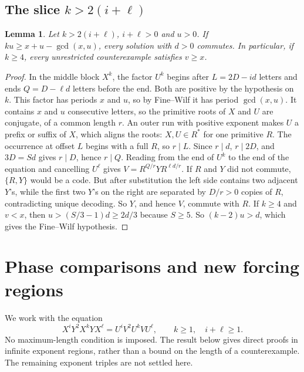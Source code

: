 \documentclass[10pt]{article}
\newtheorem{lemma}[theorem]{Lemma}
\theoremstyle{remark}\newtheorem*{remark}{Remark}
\begin{document}
\subsection{The slice \(k>2(i+\ell)\)}
\begin{lemma}\label{middle}
Let \(k>2(i+\ell)\), \(i+\ell>0\) and \(u>0\). If \(ku\ge x+u-\gcd(x,u)\), every solution with \(d>0\) commutes. In particular, if \(k\ge4\), every unrestricted counterexample satisfies \(v\ge x\).
\end{lemma}
\begin{proof}
In the middle block \(X^k\), the factor \(U^k\) begins after \(L=2D-id\) letters and ends \(Q=D-\ell d\) letters before the end. Both are positive by the hypothesis on \(k\). This factor has periods \(x\) and \(u\), so by Fine--Wilf it has period \(\gcd(x,u)\). It contains \(x\) and \(u\) consecutive letters, so the primitive roots of \(X\) and \(U\) are conjugate, of a common length \(r\). An outer run with positive exponent makes \(U\) a prefix or suffix of \(X\), which aligns the roots: \(X,U\in R^*\) for one primitive \(R\). The occurrence at offset \(L\) begins with a full \(R\), so \(r\mid L\). Since \(r\mid d\), \(r\mid 2D\), and \(3D=Sd\) gives \(r\mid D\), hence \(r\mid Q\). Reading from the end of \(U^k\) to the end of the equation and cancelling \(U^\ell\) gives \(V=R^{Q/r}YR^{\ell d/r}\). If \(R\) and \(Y\) did not commute, \(\{R,Y\}\) would be a code. But after substitution the left side contains two adjacent \(Y\)'s, while the first two \(Y\)'s on the right are separated by \(D/r>0\) copies of \(R\), contradicting unique decoding. So \(Y\), and hence \(V\), commute with \(R\).
If \(k\ge4\) and \(v<x\), then \(u>(S/3-1)d\ge 2d/3\) because \(S\ge5\). So \((k-2)u>d\), which gives the Fine--Wilf hypothesis.
\end{proof}



\section{Phase comparisons and new forcing regions}
\label{sec:phase-comparisons}
We work with the equation
\begin{equation}\label{ph:eq}
 X^iY^2X^kYX^\ell=U^iV^2U^kVU^\ell,
 \qquad k\ge1,\quad i+\ell\ge1.
\end{equation}
No maximum-length condition is imposed. The result below gives direct
proofs in infinite exponent regions, rather than a bound on the length
of a counterexample. The remaining exponent triples are not settled here.
\end{document}
